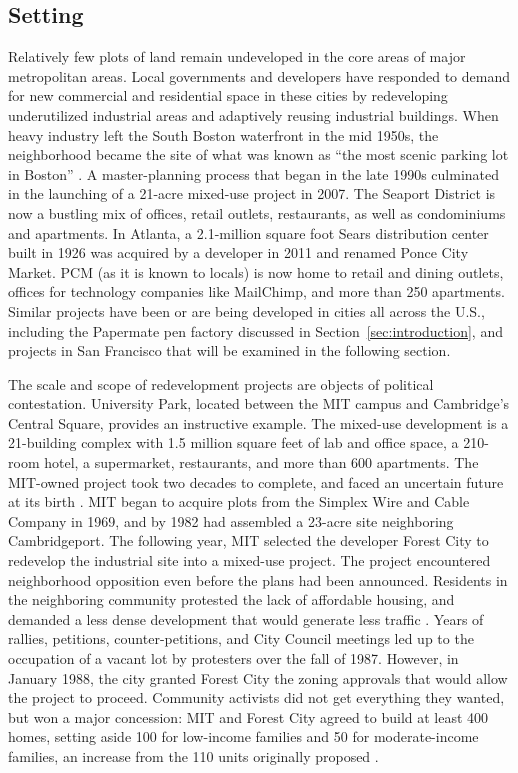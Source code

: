 \documentclass[article,11pt]{memoir}
\begin{document}
\subsection{Setting}

Relatively few plots of land remain undeveloped in the core areas of major metropolitan areas.  Local governments and developers have responded to demand for new commercial and residential space in these cities by redeveloping underutilized industrial areas and adaptively reusing industrial buildings.  When heavy industry left the South Boston waterfront in the mid 1950s, the neighborhood became the site of what was known as ``the most scenic parking lot in Boston'' \citep{cortese_empty_2007}.  A master-planning process that began in the late 1990s culminated in the launching of a 21-acre mixed-use project in 2007.  The Seaport District is now a bustling mix of offices, retail outlets, restaurants, as well as condominiums and apartments.  In Atlanta, a 2.1-million square foot Sears distribution center built in 1926 was acquired by a developer in 2011 and renamed Ponce City Market. PCM (as it is known to locals) is now home to retail and dining outlets, offices for technology companies like MailChimp, and more than 250 apartments.  Similar projects have been or are being developed in cities all across the U.S., including the Papermate pen factory discussed in Section~\ref{sec:introduction}, and projects in San Francisco that will be examined in the following section.

The scale and scope of redevelopment projects are objects of political contestation.  University Park, located between the MIT campus and Cambridge's Central Square, provides an instructive example.  The mixed-use development is a 21-building complex with 1.5 million square feet of lab and office space, a 210-room hotel, a supermarket, restaurants, and more than 600 apartments.  The MIT-owned project took two decades to complete, and faced an uncertain future at its birth \citep{diesenhouse_grand_2005}.  MIT began to acquire plots from the Simplex Wire and Cable Company in 1969, and by 1982 had assembled a 23-acre site neighboring Cambridgeport. The following year, MIT selected the developer Forest City to redevelop the industrial site into a mixed-use project.  The project encountered neighborhood opposition even before the plans had been announced.  Residents in the neighboring  community protested the lack of affordable housing, and demanded a less dense development that would generate less traffic \citep{ackerman_mits_1989}. Years of rallies, petitions, counter-petitions, and City Council meetings led up to the occupation of a vacant lot by protesters over the fall of 1987.  However, in January 1988, the city granted Forest City the zoning approvals that would allow the project to proceed.  Community activists did not get everything they wanted, but won a major concession: MIT and Forest City agreed to build at least 400 homes, setting aside 100 for low-income families and 50 for moderate-income families, an increase from the 110 units originally proposed \citep{yudis_years_1988}.
\end{document}
